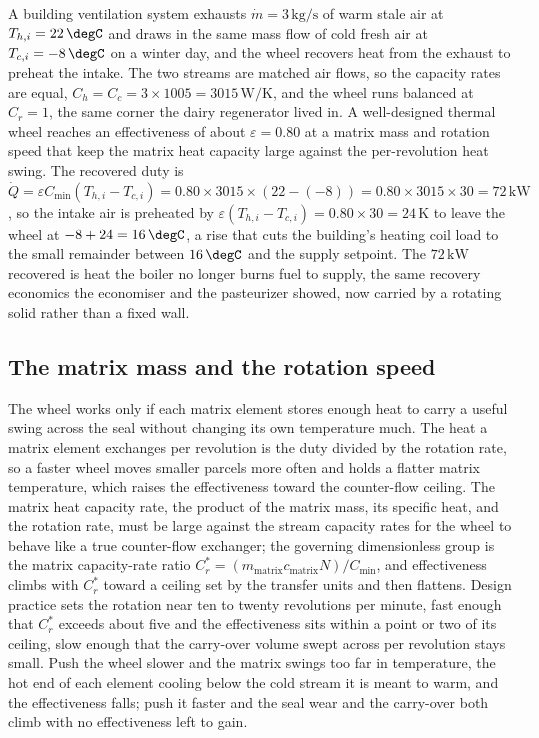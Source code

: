 A building ventilation system exhausts $\dot{m} = 3\,\text{kg/s}$ of warm stale
air at $T_{h,i} = 22\,\degC$ and draws in the same mass flow of cold fresh air at
$T_{c,i} = -8\,\degC$ on a winter day, and the wheel recovers heat from the
exhaust to preheat the intake. The two streams are matched air flows, so the
capacity rates are equal, $C_h = C_c = 3\times 1005 = 3015\,\si{\watt\per\kelvin}$,
and the wheel runs balanced at $C_r = 1$, the same corner the dairy regenerator
lived in. A well-designed thermal wheel reaches an effectiveness of about
$\varepsilon = 0.80$ at a matrix mass and rotation speed that keep the matrix
heat capacity large against the per-revolution heat swing. The recovered duty is
$\dot{Q} = \varepsilon C_{\min}(T_{h,i} - T_{c,i}) = 0.80\times 3015\times
(22 - (-8)) = 0.80\times 3015\times 30 = 72\,\text{kW}$, so the intake air is
preheated by $\varepsilon(T_{h,i} - T_{c,i}) = 0.80\times 30 = 24\,\si{\kelvin}$
to leave the wheel at $-8 + 24 = 16\,\degC$, a rise that cuts the building's
heating coil load to the small remainder between $16\,\degC$ and the supply
setpoint. The $72\,\text{kW}$ recovered is heat the boiler no longer burns fuel to
supply, the same recovery economics the economiser and the pasteurizer showed, now
carried by a rotating solid rather than a fixed wall.

\subsection{The matrix mass and the rotation speed}

The wheel works only if each matrix element stores enough heat to carry a useful
swing across the seal without changing its own temperature much. The heat a matrix
element exchanges per revolution is the duty divided by the rotation rate, so a
faster wheel moves smaller parcels more often and holds a flatter matrix
temperature, which raises the effectiveness toward the counter-flow ceiling. The
matrix heat capacity rate, the product of the matrix mass, its specific heat, and
the rotation rate, must be large against the stream capacity rates for the wheel to
behave like a true counter-flow exchanger; the governing dimensionless group is the
matrix capacity-rate ratio $C_r^\ast = (m_{\text{matrix}} c_{\text{matrix}}
N)/C_{\min}$, and effectiveness climbs with $C_r^\ast$ toward a ceiling set by the
transfer units and then flattens. Design practice sets the rotation near ten to
twenty revolutions per minute, fast enough that $C_r^\ast$ exceeds about five and
the effectiveness sits within a point or two of its ceiling, slow enough that the
carry-over volume swept across per revolution stays small. Push the wheel slower
and the matrix swings too far in temperature, the hot end of each element cooling
below the cold stream it is meant to warm, and the effectiveness falls; push it
faster and the seal wear and the carry-over both climb with no effectiveness left
to gain.

